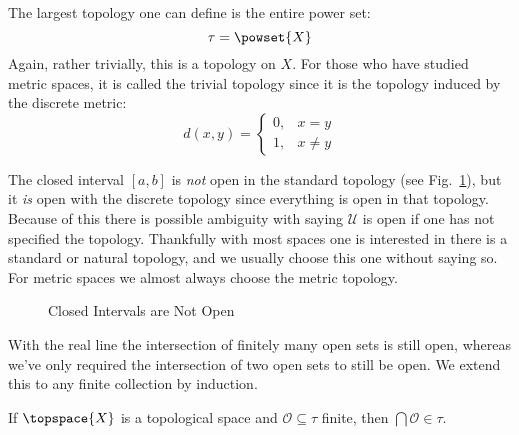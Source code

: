 \documentclass[oneside]{book}                                                  %
\begin{document}
                \begin{example}
                    The largest topology one can define is the entire power set:
                    \begin{equation}
                        \tau=\powset{X}
                    \end{equation}
                    Again, rather trivially, this is a topology on $X$. For
                    those who have studied metric spaces, it is called the
                    trivial topology since it is the topology induced by the
                    discrete metric:
                    \begin{equation}
                        d(x,y)=
                        \begin{cases}
                            0,&x=y\\
                            1,&x\ne{y}
                        \end{cases}
                    \end{equation}
                \end{example}
                The closed interval $[a,b]$ is \textit{not} open in the standard
                topology (see Fig.~\ref{fig:Closed_Interval_Not_Open}), but it
                \textit{is} open with the discrete topology since everything is
                open in that topology. Because of this there is possible
                ambiguity with saying $\mathcal{U}$ is open if one has not
                specified the topology. Thankfully with most spaces one is
                interested in there is a standard or natural topology, and we
                usually choose this one without saying so. For metric spaces we
                almost always choose the metric topology.
                \begin{figure}[H]
                    \centering
                    \captionsetup{type=figure}
                    
                    \caption{Closed Intervals are Not Open}
                    \label{fig:Closed_Interval_Not_Open}
                \end{figure}
                With the real line the intersection of finitely many open sets
                is still open, whereas we've only required the intersection of
                two open sets to still be open. We extend this to any finite
                collection by induction.
                \begin{theorem}
                    \label{thm:Finite_Intersections_Is_Open}%
                    If $\topspace{X}$ is a topological space and
                    $\mathcal{O}\subseteq\tau$ finite, then
                    $\bigcap\mathcal{O}\in\tau$.
                \end{theorem}
\end{document}
